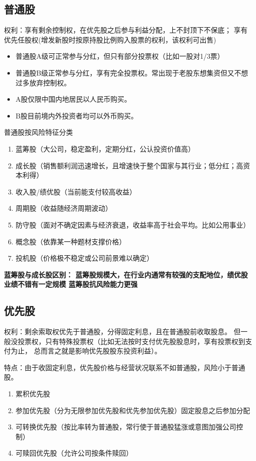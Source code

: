 \documentclass{article}
\begin{document}
\subsection*{普通股}
权利：享有剩余控制权，在优先股之后参与利益分配，上不封顶下不保底；
享有优先任股权(增发新股时按原持股比例购入股票的权利，该权利可出售)
\begin{itemize}
    \item 普通股A级可正常参与分红，但只有部分投票权（比如一股对1/3票）
    \item 普通股B级正常参与分红，享有完全投票权。常出现于老股东想集资但又不想过多放弃控制权。
    \item A股仅限中国内地居民以人民币购买。
    \item B股目前境内外投资者均可以外币购买。
\end{itemize}
普通股按风险特征分类
\begin{enumerate}
    \item 蓝筹股（大公司，稳定盈利，定期分红，公认投资价值高）
    \item 成长股（销售额利润迅速增长，且增速快于整个国家与其行业；低分红；高资本利得）
    \item 收入股/绩优股（当前能支付较高收益）
    \item 周期股（收益随经济周期波动）
    \item 防守股（面对不确定因素与经济衰退，收益率高于社会平均。比如公用事业）
    \item 概念股（依靠某一种题材支撑价格）
    \item 投机股（价格极不稳定或公司前景难以确定）
\end{enumerate}

\textbf{蓝筹股与成长股区别：
蓝筹股规模大，在行业内通常有较强的支配地位，绩优股业绩不错有一定规模
蓝筹股抗风险能力更强}
\subsection*{优先股}
权利：剩余索取权优先于普通股，分得固定利息，且在普通股前收取股息。
但一般没投票权，只有特殊投票权（比如无法按时支付优先股股息时，享有投票权到支付为止，
总而言之就是影响优先股股东投资利益）。

特点：由于收固定利息，优先股价格与经营状况联系不如普通股，风险小于普通股。
\begin{enumerate}
    \item 累积优先股
    \item 参加优先股（分为无限参加优先股和优先参加优先股）固定股息之后参加分配
    \item 可转换优先股（按比率转为普通股，常行使于普通股猛涨或意图加强公司控制）
    \item 可赎回优先股（允许公司按条件赎回）
\end{enumerate}
\end{document}
